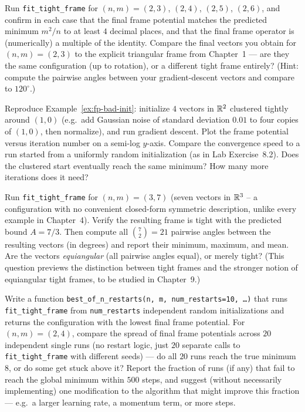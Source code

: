 \begin{exercisebox}[title={Lab Exercise 8.2: Reproducing Known Tight Frames}]
Run \texttt{fit\_tight\_frame} for $(n,m)=(2,3)$, $(2,4)$, $(2,5)$,
$(2,6)$, and confirm in each case that the final frame potential matches
the predicted minimum $m^2/n$ to at least $4$ decimal places, and that
the final frame operator is (numerically) a multiple of the identity.
Compare the final vectors you obtain for $(n,m)=(2,3)$ to the explicit
triangular frame from Chapter~1 --- are they the same configuration (up
to rotation), or a different tight frame entirely? (Hint: compute the
pairwise angles between your gradient-descent vectors and compare to
$120^\circ$.)
\end{exercisebox}

\begin{exercisebox}[title={Lab Exercise 8.3: Initialization Sensitivity}]
Reproduce Example~\ref{ex:fp-bad-init}: initialize $4$ vectors in $\mathbb{R}^2$
clustered tightly around $(1,0)$ (e.g.\ add Gaussian noise of standard
deviation $0.01$ to four copies of $(1,0)$, then normalize), and run
gradient descent. Plot the frame potential versus iteration number on a
semi-log $y$-axis. Compare the convergence speed to a run started from
a uniformly random initialization (as in Lab Exercise~8.2). Does the
clustered start eventually reach the same minimum? How many more
iterations does it need?
\end{exercisebox}

\begin{exercisebox}[title={Lab Exercise 8.4: A Frame with No Symmetry}]
Run \texttt{fit\_tight\_frame} for $(n,m)=(3,7)$ (seven vectors in
$\mathbb{R}^3$ -- a configuration with no convenient closed-form symmetric
description, unlike every example in Chapter~4). Verify the resulting
frame is tight with the predicted bound $A=7/3$. Then compute all
$\binom{7}{2}=21$ pairwise angles between the resulting vectors (in
degrees) and report their minimum, maximum, and mean. Are the vectors
\emph{equiangular} (all pairwise angles equal), or merely tight? (This
question previews the distinction between tight frames and the stronger
notion of equiangular tight frames, to be studied in Chapter~9.)
\end{exercisebox}

\begin{exercisebox}[title={Lab Exercise 8.5 (Optional, Challenge): Multiple Restarts}]
Write a function \texttt{best\_of\_n\_restarts(n, m, num\_restarts=10,
\ldots)} that runs \texttt{fit\_tight\_frame} from \texttt{num\_restarts}
independent random initializations and returns the configuration with
the lowest final frame potential. For $(n,m)=(2,4)$, compare the spread
of final frame potentials across $20$ independent single runs (no
restart logic, just $20$ separate calls to \texttt{fit\_tight\_frame}
with different seeds) --- do all $20$ runs reach the true minimum $8$,
or do some get stuck above it? Report the fraction of runs (if any) that
fail to reach the global minimum within $500$ steps, and suggest (without
necessarily implementing) one modification to the algorithm that might
improve this fraction --- e.g.\ a larger learning rate, a
momentum term, or more steps.
\end{exercisebox}
\newpage
